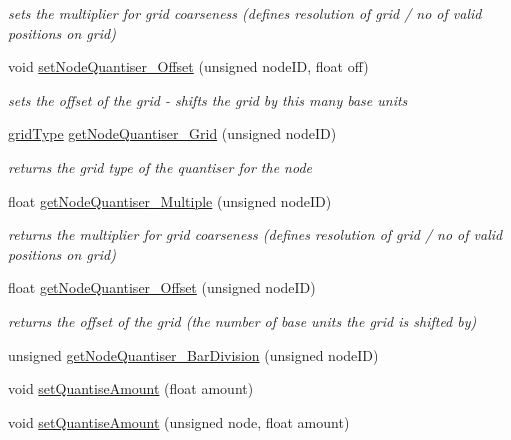 \begin{DoxyCompactItemize}
\begin{DoxyCompactList}\small\item\em sets the multiplier for grid coarseness (defines resolution of grid / no of valid positions on grid) \end{DoxyCompactList}\item 
void \mbox{\hyperlink{classMatsuokaEngine_a12aafa189a6c9302937a00de6d291d42}{set\+Node\+Quantiser\+\_\+\+Offset}} (unsigned node\+ID, float off)
\begin{DoxyCompactList}\small\item\em sets the offset of the grid -\/ shifts the grid by this many base units \end{DoxyCompactList}\item 
\mbox{\hyperlink{classQuantisedEventQueue_ae186d50bd503038452edbbdd0c7c259e}{grid\+Type}} \mbox{\hyperlink{classMatsuokaEngine_adce59f3e8b45ab4c0ca804b17d8eb749}{get\+Node\+Quantiser\+\_\+\+Grid}} (unsigned node\+ID)
\begin{DoxyCompactList}\small\item\em returns the grid type of the quantiser for the node \end{DoxyCompactList}\item 
float \mbox{\hyperlink{classMatsuokaEngine_a1d0b1a452f3d9252d460177779b2d681}{get\+Node\+Quantiser\+\_\+\+Multiple}} (unsigned node\+ID)
\begin{DoxyCompactList}\small\item\em returns the multiplier for grid coarseness (defines resolution of grid / no of valid positions on grid) \end{DoxyCompactList}\item 
float \mbox{\hyperlink{classMatsuokaEngine_a05ab0eeb8a7d0b7f3a478ba41735cb8d}{get\+Node\+Quantiser\+\_\+\+Offset}} (unsigned node\+ID)
\begin{DoxyCompactList}\small\item\em returns the offset of the grid (the number of base units the grid is shifted by) \end{DoxyCompactList}\item 
unsigned \mbox{\hyperlink{classMatsuokaEngine_af7edec268c651be3a45061cf9e90c123}{get\+Node\+Quantiser\+\_\+\+Bar\+Division}} (unsigned node\+ID)
\item 
void \mbox{\hyperlink{classMatsuokaEngine_a9057153267968489cd83ca31a1fbd985}{set\+Quantise\+Amount}} (float amount)
\item 
void \mbox{\hyperlink{classMatsuokaEngine_ae053fd0bdd438fa8a7f4cbd151122f89}{set\+Quantise\+Amount}} (unsigned node, float amount)

\end{DoxyCompactItemize}
